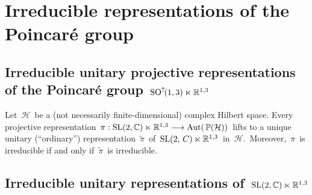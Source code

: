 

\chapter{Irreducible representations of the Poincaré group}
\setcounter{theorem}{0}
\setcounter{equation}{0}


\renewcommand{\theenumi}{\roman{enumi}}
\renewcommand{\labelenumi}{\textnormal{(\theenumi)}$\;\;$}



\vskip 1.0cm

\vskip 1.0cm

\vskip 1.0cm

\vskip 1.0cm

%


\vskip 1.0cm
\section{Irreducible unitary projective representations of the Poincaré group \,$\textnormal{SO}^{\uparrow\!}(1,3) \ltimes \mathbb{R}^{1,3}$}

\vskip 0.3cm
\begin{theorem}
\mbox{}
\vskip 0.1cm
\noindent
Let \,$\mathcal{H}$\, be a (not necessarily finite-dimensional) complex Hilbert space.
Every projective representation
\,$\pi : \textnormal{SL}(2,\mathbb{C}) \ltimes \mathbb{R}^{1,3} \longrightarrow \textnormal{Aut}\!\left(\,\mathbb{P}(\mathcal{H})\right)$\,
lifts to a unique unitary (``ordinary'') representation
\,$\widetilde{\pi}$\, of \,$\textnormal{SL}(2,\,C) \ltimes \mathbb{R}^{1,3}$\,
in \,$\mathcal{H}$.\,
Moreover, \,$\pi$\, is irreducible if and only if \,$\widetilde{\pi}$\, is irreducible.
\end{theorem}


\vskip 1.0cm
\section{Irreducible unitary representations of \,$\textnormal{SL}(2,\mathbb{C}) \ltimes \mathbb{R}^{1,3}$}

